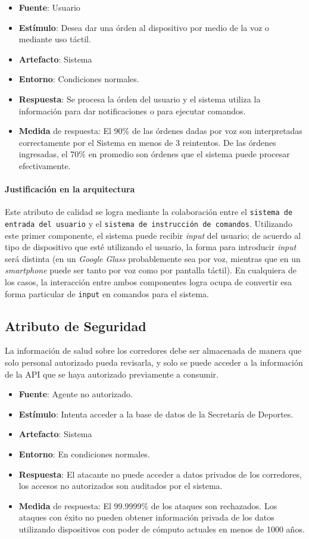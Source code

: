 \begin{itemize}
  \item \textbf{Fuente}: Usuario
  \item \textbf{Estímulo}: Desea dar una órden al dispositivo por medio de la voz o mediante uso táctil.
  \item \textbf{Artefacto}: Sistema
  \item \textbf{Entorno}: Condiciones normales.
  \item \textbf{Respuesta}: Se procesa la órden del usuario y el sistema utiliza la información para dar notificaciones o para ejecutar comandos.
  \item \textbf{Medida} de respuesta: El 90\% de las órdenes dadas por voz son interpretadas correctamente por el Sistema en menos de 3 reintentos. De las órdenes ingresadas, el 70\% en promedio son órdenes que el sistema puede procesar efectivamente.
\end{itemize}

\paragraph{Justificación en la arquitectura} %
Este atributo de calidad se logra mediante la colaboración entre el \texttt{sistema de entrada del usuario} y el \texttt{sistema de instrucción de comandos}. Utilizando este primer componente, el sistema puede recibir \textit{input} del usuario; de acuerdo al tipo de dispositivo que esté utilizando el usuario, la forma para introducir \textit{input} será distinta (en un \emph{Google Glass} probablemente sea por voz, mientras que en un \emph{smartphone} puede ser tanto por voz como por pantalla táctil). En cualquiera de los casos, la interacción entre ambos componentes logra ocupa de convertir esa forma particular de \texttt{input} en comandos para el sistema.

\subsection{Atributo de Seguridad}
La información de salud sobre los corredores debe ser almacenada de manera que solo personal autorizado pueda revisarla, y solo se puede acceder a la información de la API que se haya autorizado previamente a consumir.

\begin{itemize}
  \item \textbf{Fuente}: Agente no autorizado.
  \item \textbf{Estímulo}: Intenta acceder a la base de datos de la Secretaría de Deportes.
  \item \textbf{Artefacto}: Sistema
  \item \textbf{Entorno}: En condiciones normales.
  \item \textbf{Respuesta}: El atacante no puede acceder a datos privados de los corredores, los accesos no autorizados son auditados por el sistema.
  \item \textbf{Medida} de respuesta: El 99.9999\% de los ataques son rechazados. Los ataques con éxito no pueden obtener información privada de los datos utilizando dispositivos con poder de cómputo actuales en menos de 1000 años.
\end{itemize}

